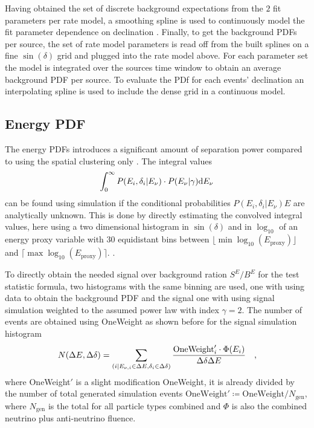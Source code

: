 Having obtained the set of discrete background expectations from the $2$ fit parameters per rate model, a smoothing spline is used to continuously model the fit parameter dependence on declination .
Finally, to get the background PDFs per source, the set of rate model parameters is read off from the built splines on a fine $\sin(\delta)$ grid and plugged into the rate model above.
For each parameter set the model is integrated over the sources time window to obtain an average background PDF per source.
To evaluate the PDf for each events' declination an interpolating spline is used to include the dense grid in a continuous model.

\subsection*{Energy PDF}
The energy PDFs introduces a significant amount of separation power compared to using the spatial clustering only .
The integral values
\begin{equation}
  \int_0^\infty P(E_i,\delta_i|E_\nu)\cdot P(E_\nu|\gamma) \mathrm{d}E_\nu
\end{equation}
can be found using simulation if the conditional probabilities $P(E_i,\delta_i|E_\nu)E$ are analytically unknown.
This is done by directly estimating the convolved integral values, here using a two dimensional histogram in $\sin(\delta)$ and in $\log_{10}$ of an energy proxy variable with $30$ equidistant bins between $\lfloor \min\log_{10}(E_\text{proxy}) \rfloor$ and $\lceil \max\log_{10}(E_\text{proxy}) \rceil$.
.

To directly obtain the needed signal over background ration $S^E / B^E$ for the test statistic formula, two histograms with the same binning are used, one with using data to obtain the background PDF and the signal one with using signal simulation weighted to the assumed power law with index $\gamma = 2$.
The number of events are obtained using OneWeight as shown before for the signal simulation histogram
\begin{equation}
  N(\Delta E, \Delta\delta)
  = \sum_{(i|E_{\nu,i}\in\Delta E, \delta_i\in\Delta\delta)}
    \frac{\text{OneWeight}'_i \cdot \Phi(E_i)}{\Delta\delta \Delta E}
  \quad\text{,}
\end{equation}
where OneWeight$'$ is a slight modification OneWeight, it is already divided by the number of total generated simulation events $\text{OneWeight}'\coloneqq\text{OneWeight}/N_\text{gen}$, where $N_\text{gen}$ is the total for all particle types combined and $\Phi$ is also the combined neutrino plus anti-neutrino fluence.

